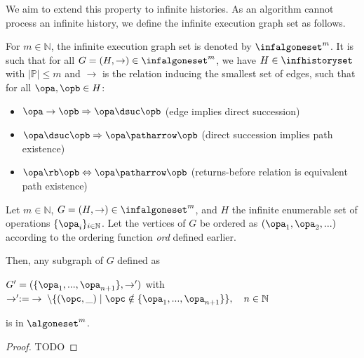We aim to extend this property to infinite histories. As an algorithm cannot process an infinite history, we define the infinite execution graph set as follows.

\begin{definition} 
For $m\in\mathbb{N}$, the infinite execution graph set is denoted by $\infalgoneset^m$. It is such that for all $G=(H,\rightarrow)\in\infalgoneset^m$, we have $H\in\infhistoryset$ with $|\mathbb{P}|\leq m$ and $\rightarrow$ is the relation inducing the smallest set of edges, such that for all $\opa,\opb\in H$:
\vspace{-0.5em}
\begin{itemize}
    \item[$\ast$] $\opa\rightarrow\opb\Rightarrow\opa\dsuc\opb$ (edge implies direct succession)
    \item[$\ast$] $\opa\dsuc\opb\Rightarrow\opa\patharrow\opb$ (direct succession implies path existence)
    \item[$\ast$] $\opa\rb\opb\Leftrightarrow\opa\patharrow\opb$ (returns-before relation is equivalent path existence)
\end{itemize}
\end{definition}

\begin{lemma}\label{lemma:inclus}
    Let $m\in\mathbb{N}$, $G=(H,\rightarrow)\in\infalgoneset^m$, and $H$ the infinite enumerable set of operations $\{\opa_i\}_{i\in\mathbb{N}}$. Let the vertices of $G$ be ordered as $(\opa_1,\opa_2,...)$ according to the ordering function \textsl{ord} defined earlier. 
    
    Then, any subgraph of $G$ defined as 
    \vspace{-0.5em}
    \begin{center}
        $G'=(\{\opa_1,...,\opa_{n+1}\},\rightarrow')$ with $\rightarrow':=\;\rightarrow\;\setminus\{(\opc,\_)\;|\;\opc\notin\{\opa_1,...,\opa_{n+1}\}\},\quad n\in\mathbb{N}$
    \end{center}
    \vspace{-0.5em}
     is in $\algoneset^m$.
\end{lemma}
\begin{proof}
    TODO
\end{proof}


